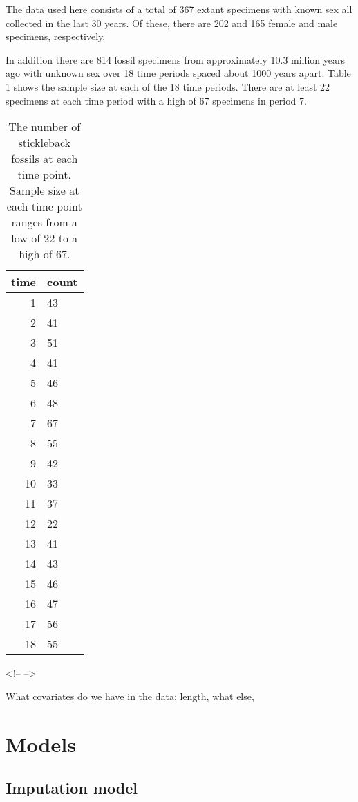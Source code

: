 \documentclass[
  12pt,
]{article}
\begin{document}
The data used here consists of a total of 367 extant specimens with
known sex all collected in the last 30 years. Of these, there are 202
and 165 female and male specimens, respectively.

In addition there are 814 fossil specimens from approximately 10.3
million years ago with unknown sex over 18 time periods spaced about
1000 years apart. Table 1 shows the sample size at each of the 18 time
periods. There are at least 22 specimens at each time period with a high
of 67 specimens in period 7.

\begin{table}[ht]
\centering
\begin{tabular}{rl}
  \hline
time & count \\ 
  \hline
  1 & 43 \\ 
    2 & 41 \\ 
    3 & 51 \\ 
    4 & 41 \\ 
    5 & 46 \\ 
    6 & 48 \\ 
    7 & 67 \\ 
    8 & 55 \\ 
    9 & 42 \\ 
   10 & 33 \\ 
   11 & 37 \\ 
   12 & 22 \\ 
   13 & 41 \\ 
   14 & 43 \\ 
   15 & 46 \\ 
   16 & 47 \\ 
   17 & 56 \\ 
   18 & 55 \\ 
   \hline
\end{tabular}
<!-- \label{tab1} -->
\caption{The number of stickleback fossils at each time point.  Sample size at each time point ranges from a low of 22 to a high of 67.}
\end{table}

What covariates do we have in the data: length, what else,

\hypertarget{sec:models}{%
\section{Models}\label{sec:models}}

\hypertarget{imputation-model}{%
\subsection{Imputation model}\label{imputation-model}}
\end{document}
